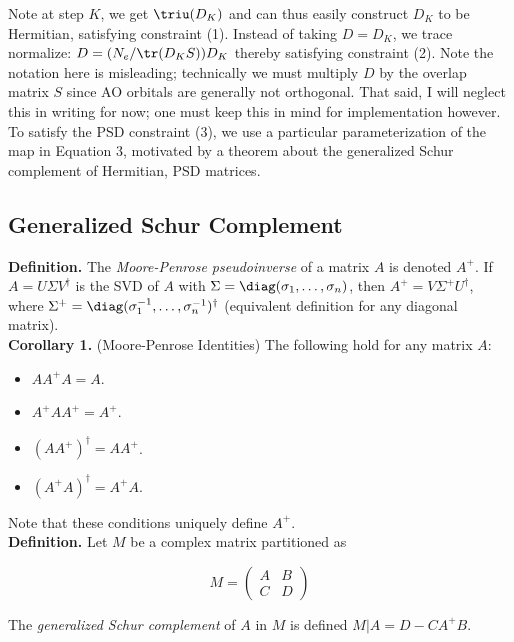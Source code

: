 \documentclass[12pt]{article}
\begin{document}
    Note at step $K$, we get $\triu(D_K)$ and can thus easily construct $D_K$ to be Hermitian, satisfying constraint (1). Instead of taking $D = D_K$, we trace normalize: $D = (N_e/ \tr (D_KS))D_K$ thereby satisfying constraint (2). Note the notation here is misleading; technically we must multiply $D$ by the overlap matrix $S$ since AO orbitals are generally not orthogonal. That said, I will neglect this in writing for now; one must keep this in mind for implementation however. \\[-6pt] 
    
    To satisfy the PSD constraint (3), we use a particular parameterization of the map in Equation 3, motivated by a theorem about the generalized Schur complement of Hermitian, PSD matrices. 

    \subsection{Generalized Schur Complement}
    \textbf{Definition.} The \textit{Moore-Penrose pseudoinverse} of a matrix $A$ is denoted $A^+$. If $A = U \Sigma V^\dagger$ is the SVD of $A$ with $\Sigma = \diag(\sigma_1, \ldots, \sigma_n)$, then $A^+ = V \Sigma^+ U^\dagger$, where $\Sigma^+ = \diag(\sigma_1^{-1}, \ldots, \sigma_n^{-1})^\dagger$ (equivalent definition for any diagonal matrix). \\[-6pt]

    \textbf{Corollary 1.} (Moore-Penrose Identities) The following hold for any matrix $A$:
    \begin{itemize}
        \item[(a)] $A A^+ A = A$.
        \item[(b)] $A^+ A A^+ = A^+$.
        \item[(c)] $(AA^+)^\dagger = A A^+$.
        \item[(d)] $(A^+ A)^ \dagger = A ^+ A$.
    \end{itemize}
    Note that these conditions uniquely define $A^+$. \\[-6pt]
    
    \textbf{Definition.} Let $M$ be a complex matrix partitioned as

    \[ M = \begin{pmatrix}
        A & B \\ C & D
    \end{pmatrix}\]
    
    The \textit{generalized Schur complement} of $A$ in $M$ is defined $M|A = D - CA^+ B$. \\[-6pt]
\end{document}
